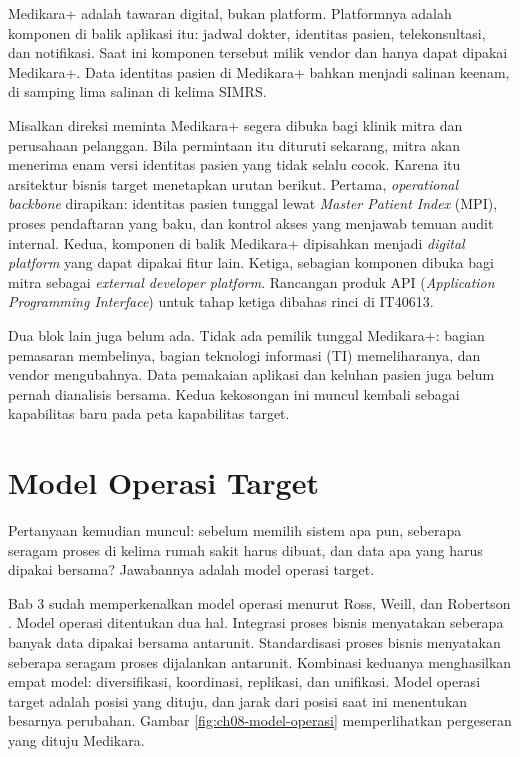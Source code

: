 \begin{kasus}[title={Kasus Medikara Health: Medikara+ sebagai Calon Platform Digital},
              parbox=false]
  Medikara+ adalah tawaran digital, bukan platform. Platformnya adalah komponen di balik
  aplikasi itu: jadwal dokter, identitas pasien, telekonsultasi, dan notifikasi. Saat ini
  komponen tersebut milik vendor dan hanya dapat dipakai Medikara+. Data identitas pasien
  di Medikara+ bahkan menjadi salinan keenam, di samping lima salinan di kelima SIMRS.

  Misalkan direksi meminta Medikara+ segera dibuka bagi klinik mitra dan perusahaan
  pelanggan. Bila permintaan itu dituruti sekarang, mitra akan menerima enam versi
  identitas pasien yang tidak selalu cocok. Karena itu arsitektur bisnis target menetapkan
  urutan berikut. Pertama, \textit{operational backbone} dirapikan: identitas pasien
  tunggal lewat \textit{Master Patient Index} (MPI), proses pendaftaran yang baku, dan
  kontrol akses yang menjawab temuan audit internal. Kedua, komponen di balik Medikara+
  dipisahkan menjadi \textit{digital platform} yang dapat dipakai fitur lain. Ketiga,
  sebagian komponen dibuka bagi mitra sebagai \textit{external developer platform}.
  Rancangan produk API (\textit{Application Programming Interface}) untuk tahap ketiga
  dibahas rinci di IT40613.

  Dua blok lain juga belum ada. Tidak ada pemilik tunggal Medikara+: bagian pemasaran
  membelinya, bagian teknologi informasi (TI) memeliharanya, dan vendor mengubahnya. Data
  pemakaian aplikasi dan keluhan pasien juga belum pernah dianalisis bersama. Kedua
  kekosongan ini muncul kembali sebagai kapabilitas baru pada peta kapabilitas target.
\end{kasus}

\section{Model Operasi Target}

Pertanyaan kemudian muncul: sebelum memilih sistem apa pun, seberapa seragam proses di
kelima rumah sakit harus dibuat, dan data apa yang harus dipakai bersama? Jawabannya adalah
model operasi target.

Bab 3 sudah memperkenalkan model operasi menurut Ross, Weill, dan Robertson
\cite{ross2006}. Model operasi ditentukan dua hal. Integrasi proses bisnis menyatakan
seberapa banyak data dipakai bersama antarunit. Standardisasi proses bisnis menyatakan
seberapa seragam proses dijalankan antarunit. Kombinasi keduanya menghasilkan empat model:
diversifikasi, koordinasi, replikasi, dan unifikasi. Model operasi target adalah posisi
yang dituju, dan jarak dari posisi saat ini menentukan besarnya perubahan. Gambar
\ref{fig:ch08-model-operasi} memperlihatkan pergeseran yang dituju Medikara.

